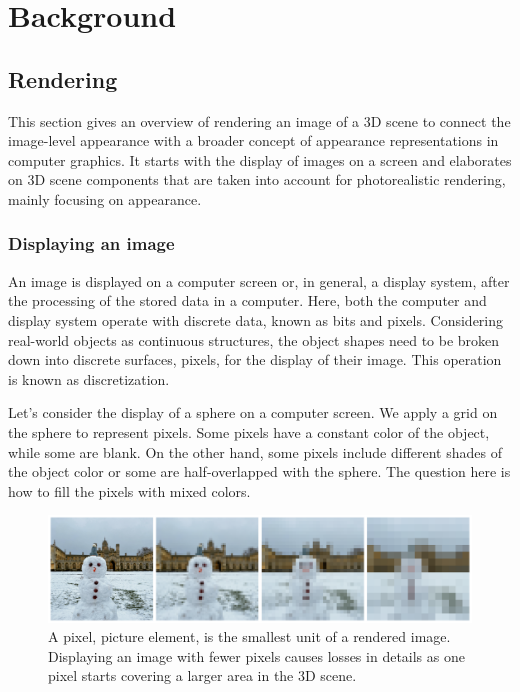 \chapter{Background}

\section{Rendering}

This section gives an overview of rendering an image of a 3D scene to connect the image-level appearance with a broader concept of appearance representations in computer graphics.  It starts with the display of images on a screen and elaborates on 3D scene components that are taken into account for photorealistic rendering, mainly focusing on appearance. 

\subsection{Displaying an image}
An image is displayed on a computer screen or, in general, a display system, after the processing of the stored data in a computer. Here, both the computer and display system operate with discrete data, known as bits and pixels. Considering real-world objects as continuous structures, the object shapes need to be broken down into discrete surfaces, pixels, for the display of their image. This operation is known as discretization. 

Let's consider the display of a sphere on a computer screen. We apply a grid on the sphere to represent pixels. Some pixels have a constant color of the object, while some are blank. On the other hand, some pixels include different shades of the object color or some are half-overlapped with the sphere. The question here is how to fill the pixels with mixed colors. 


\begin{figure}
  \centering

    \includegraphics[width=\linewidth]{Images/pixelate_image_snowman.png}

   \caption{A pixel, picture element, is the smallest unit of a rendered image. Displaying an image with fewer pixels causes losses in details as one pixel starts covering a larger area in the 3D scene.}
   \label{fig:color-approximate}
\end{figure}


